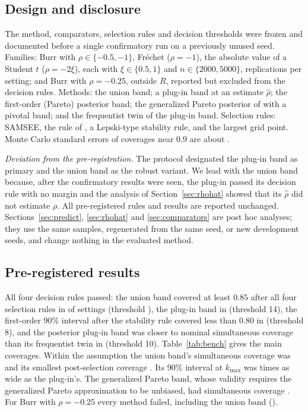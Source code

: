 \documentclass[11pt]{article}
\theoremstyle{definition}
\theoremstyle{remark}
\numberwithin{equation}{section}
\begin{document}
\subsection{Design and disclosure}

The method, comparators, selection rules and decision thresholds were frozen and documented before a single confirmatory run on a previously unused seed. Families: Burr with $\rho\in\{-0.5,-1\}$, Fr\'echet ($\rho=-1$), the absolute value of a Student $t$ ($\rho=-2\xi$), each with $\xi\in\{0.5,1\}$ and $n\in\{2000,5000\}$, \benchReps{} replications per setting; and Burr with $\rho=-0.25$, outside $R$, reported but excluded from the decision rules. Methods: the union band; a plug-in band at an estimate $\hat\rho$; the first-order (Pareto) posterior band; the generalized Pareto posterior of \citet{dombry2023} with a pivotal band; and the frequentist twin of the plug-in band. Selection rules: SAMSEE, the rule of \citet{guillouhall2001}, a Lepski-type stability rule, and the largest grid point. Monte Carlo standard errors of coverages near $0.9$ are about \seBench.

\emph{Deviation from the pre-registration.} The protocol designated the plug-in band as primary and the union band as the robust variant. We lead with the union band because, after the confirmatory results were seen, the plug-in passed its decision rule with no margin and the analysis of Section~\ref{sec:rhohat} showed that its $\hat\rho$ did not estimate $\rho$. All pre-registered rules and results are reported unchanged. Sections~\ref{sec:predict}, \ref{sec:rhohat} and \ref{sec:comparators} are post hoc analyses; they use the same samples, regenerated from the same seed, or new development seeds, and change nothing in the evaluated method.

\subsection{Pre-registered results}

All four decision rules passed: the union band covered at least $0.85$ after all four selection rules in \DoneB{} of \nCellsIn{} settings (threshold \nCellsIn), the plug-in band in \DoneA{} (threshold 14), the first-order 90\% interval after the stability rule covered less than $0.80$ in \Dtwo{} (threshold 8), and the posterior plug-in band was closer to nominal simultaneous coverage than its frequentist twin in \Dthree{} (threshold 10). Table~\ref{tab:bench} gives the main coverages. Within the assumption the union band's simultaneous coverage was \unionSimIn{} and its smallest post-selection coverage \unionPostMinIn. Its 90\% interval at $k_{\max}$ was \unionVsPluginWidth{} times as wide as the plug-in's. The generalized Pareto band, whose validity requires the generalized Pareto approximation to be unbiased, had simultaneous coverage \gpSimIn. For Burr with $\rho=-0.25$ every method failed, including the union band (\unionSimOut).
\end{document}
